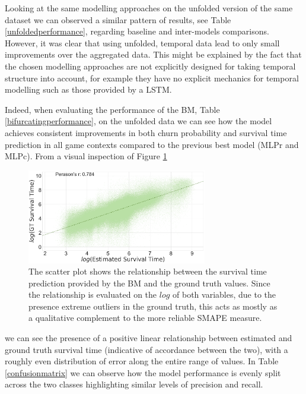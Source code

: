 

Looking at the same modelling approaches on the unfolded version of the same dataset we can observed a similar pattern of results, see Table \ref{unfoldedperformance}, regarding baseline and inter-models comparisons. However, it was clear that using unfolded, temporal data lead to only small improvements over the aggregated data. This might be explained by the fact that the chosen modelling approaches are not explicitly designed for taking temporal structure into account, for example they have no explicit mechanics for temporal modelling such as those provided by a LSTM.



Indeed, when evaluating the performance of the BM, Table \ref{bifurcatingperformance}, on the unfolded data we can see how the model achieves consistent improvements in both churn probability and survival time prediction in all game contexts compared to the previous best model (MLPr and MLPc). From a visual inspection of Figure \ref{perfsurv} 

\begin{figure}[h]
  \centering
  \includegraphics[width=0.7\textwidth]{images/chapter_3/performance_survival_31.pdf}
  \caption[\textbf{Performance of the BM on survival task}]{The scatter plot shows the relationship between the survival time prediction provided by the BM and the ground truth values. Since the relationship is evaluated on the $log$ of both variables, due to the presence extreme outliers in the ground truth, this acts as mostly as a qualitative complement to the more reliable SMAPE measure.}
  \label{perfsurv}
\end{figure}

we can see the presence of a positive linear relationship between estimated and ground truth survival time (indicative of accordance between the two), with a roughly even distribution of error along the entire range of values. In Table \ref{confusionmatrix}  
we can observe how the model performance is evenly split across the two classes highlighting similar levels of precision and recall. 

